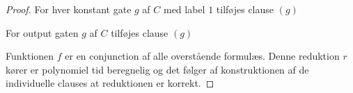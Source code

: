 \begin{itemize}
\begin{proof}
    For hver konstant gate $g$ af $C$ med label $1$ tilføjes clause $(g)$  
    \smallskip

    For output gaten $g$ af $C$ tilføjes clause $(g)$  
    \smallskip
    
    Funktionen $f$ er en conjunction af alle overstående formulæs. Denne reduktion $r$ kører er polynomiel tid beregnelig og det følger af konstruktionen af de individuelle clauses at reduktionen er korrekt. 

  \end{proof}
\end{itemize}

\newpage
